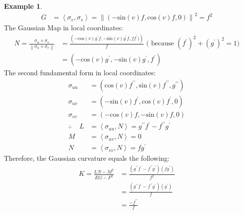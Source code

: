 \documentclass{article}
\theoremstyle{plain}
\theoremstyle{definition}
\newtheorem{example}{Example}
\theoremstyle{remark}
\begin{document}
\begin{example}
\begin{align*}
        G & = \left\langle \sigma_v, \sigma_v \right\rangle  = \left\lVert (-\text{sin}(v)f, \text{cos}(v)f, 0) \right\rVert ^2 = f^2
    \end{align*}
    The Gaussian Map in local coordinates:
    \begin{align*}
        N = \frac{\sigma_u \times \sigma_v }{\left\lVert \sigma_u \times \sigma_v \right\rVert } & =  \frac{\left( -\text{cos}(v)g^{\prime}f, -\text{sin}(v)g^{\prime}f, ff^{\prime} )\right)}{f} \text{  (  because  \((f^{\prime})^2 + (g^{\prime})^2  = 1  ) \)} \\
                                                                                                 & = \left( -\text{cos}(v)g^{\prime}, -\text{sin}(v)g^{\prime}, f^{\prime} \right)
    \end{align*}
    The second fundamental form in local coordinates:
    \begin{align*}
        \sigma_{uu}              & = (\text{cos}(v)f^{\prime \prime}, \text{sin}(v)f^{\prime \prime}, g^{\prime \prime})                     \\
        \sigma_{uv}              & = (-\text{sin}(v)f^{\prime}, \text{cos}(v)f^{\prime}, 0)                                                  \\
        \sigma_{vv}              & = (-\text{cos}(v)f, -\text{sin}(v)f, 0 )                                                                  \\
        \therefore \; \; \; \; L & = \left\langle \sigma_{uu}, N \right\rangle = g^{\prime \prime}f^{\prime} -  f^{\prime \prime} g^{\prime} \\
        M                        & = \left\langle \sigma_{uv} , N \right\rangle = 0                                                          \\
        N                        & = \left\langle \sigma_{vv} , N \right\rangle = fg^{\prime}
    \end{align*}
    Therefore, the Gaussian curvature equals the following:
    \begin{align*}
        K = \frac{LN-M^2}{EG-F^2} & = \frac{(g^{\prime \prime}f^{\prime} -  f^{\prime \prime} g^{\prime})(fg^{\prime} ) }{ f^2} \\
                                  & =  \frac{(g^{\prime \prime}f^{\prime} -  f^{\prime \prime} g^{\prime})(g^{\prime} ) }{ f}   \\
                                  & = \frac{-f^{\prime \prime}}{f}
    \end{align*}

\end{example}
\end{document}
